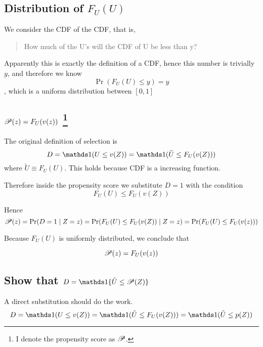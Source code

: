 \subsection{Distribution of $F_U(U)$}

We consider the CDF of the CDF, that is, 
\begin{quote}
    How much of the U's will the CDF of U be less than y?
\end{quote}

Apparently this is exactly the definition of a CDF, hence this number is trivially $y$, and therefore we know
\begin{equation*}
    \Pr(F_U(U) \le y) = y
\end{equation*}, 
which is a uniform distribution between $[0,1]$


\subsection{$\mathscr{P}(z) = F_U(v(z))$ 
\protect\footnote{I denote the propensity score as $\mathscr{P}$.}}

The original definition of selection is 
\begin{equation*}
    D = \one (U \le v(Z) ) = \one (\tilde{U} \le F_U(v(Z)))
\end{equation*}
where $\tilde{U}\equiv F_U(U)$. 
This holds because CDF is a increasing function.

Therefore inside the propensity score we substitute $D=1$ with the condition
\begin{equation*}
    F_U(U) \le F_U(v(Z))
\end{equation*}

Hence
\begin{equation*}
    \mathscr{P}(z) = \Pr(D=1 \mid Z=z) = \Pr(F_U(U) \le F_U(v(Z)) \mid Z=z) = \Pr(F_U(U) \le F_U(v(z)) )
\end{equation*}

Because $F_U(U)$ is uniformly distributed, we conclude that

\begin{equation*}
    \mathscr{P}(z) = F_U(v(z))
\end{equation*}

\subsection{Show that $D = \one \{ \tilde{U} \le \ps(Z) \}$}

A direct substitution should do the work.
\begin{equation*}
    D = \one (U \le v(Z) ) = \one (\tilde{U} \le F_U(v(Z))) = \one (\tilde{U} \le p(Z))
\end{equation*}
